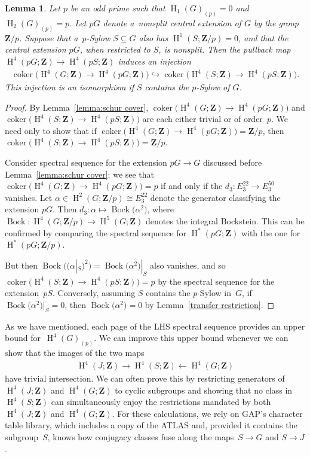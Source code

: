 \documentclass[pdftex]{sigma}
\numberwithin{equation}{section}
\newtheorem{Lemma}[Theorem]{Lemma}
\newcommand\bZ{\mathbf Z}
\DeclareMathOperator\homology{H}
\renewcommand\H{\homology}
\newcommand\<\langle
\renewcommand\>\rangle
\DeclareMathOperator\coker{coker}
\begin{document}
\begin{Lemma}\label{lemma:cokers} Let $p$ be an odd prime such that $\H_1(G)_{(p)} = 0$ and $\H_2(G)_{(p)} = p$. Let $pG$ denote a~nonsplit central extension of $G$ by the group $\bZ/p$. Suppose that a~$p$-Sylow $S \subseteq G$ also has $\H^1(S;\bZ/p) = 0$, and that the central extension $pG$, when restricted to $S$, is nonsplit. Then the pullback map $\H^4(pG;\bZ) \to \H^4(pS;\bZ)$ induces an injection
\begin{gather*}
\coker\big(\H^4(G;\bZ) \to \H^4(pG;\bZ)\big)\hookrightarrow \coker\big(\H^4(S;\bZ) \to \H^4(pS;\bZ)\big).
\end{gather*}
This injection is an isomorphism if $S$ contains the $p$-Sylow of $G$.
\end{Lemma}
\begin{proof} By Lemma~\ref{lemma:schur cover}, $\coker\big(\H^4(G;\bZ) \to \H^4(pG;\bZ)\big)$ and $\coker\big(\H^4(S;\bZ) \to \H^4(pS;\bZ)\big)$ are each {either trivial or of order~$p$}. We need only to show that if $\coker\big(\H^4(G;\bZ) \to \H^4(pG;\bZ)\big) = \bZ/p$, then $\coker\big(\H^4(S;\bZ) \to \H^4(pS;\bZ)\big) = \bZ/p$.

 Consider spectral sequence for the extension $pG \to G$ discussed before Lemma~\ref{lemma:schur cover}: we see that
 $\coker\big(\H^4(G;\bZ) \to \H^4(pG;\bZ)\big) = p$ if and only if the $d_3\colon E_3^{22} \to E_3^{50}$
 vanishes. Let $\alpha \in \H^2(G;\bZ/p) {{}\cong E_3^{22}}$ denote the generator classifying the extension $pG$. Then $d_3\colon \alpha \mapsto \operatorname{Bock}\big(\alpha^2\big)$, where $\operatorname{Bock} \colon \H^4(G;\bZ/p) \to \H^5(G;\bZ)$ denotes the integral Bockstein. This can be confirmed by comparing the spectral sequence for $\H^*(pG;\bZ)$ with the one for $\H^*(pG;\bZ/p)$.

But then $\operatorname{Bock}\big((\alpha|_S)^2\big) = \operatorname{Bock}\big(\alpha^2\big)|_S$ also vanishes, and so $\coker\big(\H^4(S;\bZ) \to \H^4(pS;\bZ)\big) \allowbreak = p$ by the spectral sequence for the extension~$pS$. Conversely, assuming $S$ contains the $p$-Sylow in~$G$, if $\operatorname{Bock}\big(\alpha^2\big)|_S = 0$, then $\operatorname{Bock}\big(\alpha^2\big) = 0$ by Lemma~\ref{transfer restriction}.
\end{proof}

As we have mentioned, each page of the LHS spectral sequence provides an upper bound for~$\H^4(G)_{(p)}$. We can improve this upper bound whenever we can show that the images of the two maps
\begin{gather*}
\H^4(J;\bZ) \to \H^4(S;\bZ) \leftarrow \H^4(G;\bZ)
\end{gather*}
have trivial intersection. We can often prove this by restricting generators of~$\H^4(J;\bZ)$ and $\H^4(G;\bZ)$ to cyclic subgroups and showing that no class in $\H^4(S;\bZ)$ can simultaneously enjoy the restrictions mandated by both $\H^4(J;\bZ)$ and $\H^4(G;\bZ)$. For these calculations, we rely on GAP's character table library, which includes a copy of the ATLAS and, provided it contains the subgroup~$S$, knows how conjugacy classes fuse along the maps~$S \to G$ and $S \to J$.
\end{document}
